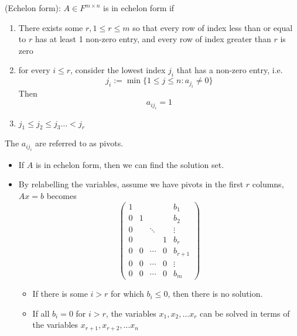 \begin{definition}
(Echelon form): $A \in F^{m \times n}$ is in echelon form if 
    \begin{enumerate}
        \item There exists some $r, 1 \leq r \leq m$ so that every row of index less than or equal to $r$ has at least 1 non-zero entry, and every row of index greater than $r$ is zero 
        \item for every $i \leq r$, consider the lowest index $j_i$ that has a non-zero entry, i.e. 
        \[
            j_i := \min \{ 1 \leq j \leq n: a_{j_i} \neq 0 \} 
        \]
        Then
        \[
            a_{ij_i} = 1
        \]
        \item $j_1 \leq j_2 \leq j_3 \hdots < j_r$
    \end{enumerate} 

\end{definition} 

\begin{remark}
The $a_{i j_i}$ are referred to as pivots. \\
\begin{itemize}
    \item If $A$ is in echelon form, then we can find the solution set. 
    \item By relabelling the variables, assume we have pivots in the first $r$ columns, $Ax  = b$ becomes 
    \[
        \left(
        \begin{array}{cccc|c}
        1 &   &        &   & b_1 \\
        0 & 1 &        &   & b_2 \\
        0 &   & \ddots &   & \vdots \\
        0 &   &        & 1 & b_r \\
        \hline
        0 & 0 & \cdots & 0 & b_{r+1} \\
        0 & 0 & \cdots & 0 & \vdots \\
        0 & 0 & \cdots & 0 & b_m
        \end{array}
        \right)
    \]
    \begin{itemize}
        \item If there is some $i > r$ for which $b_i \leq 0$, then there is no solution.
        \item If all $b_i = 0$ for $i > r$, the variables $x_1, x_2, \hdots x_r$ can be solved in terms of the variables $x_{r + 1}, x_{r + 2}, \hdots x_n$
    \end{itemize} 
\end{itemize} 
\end{remark}


